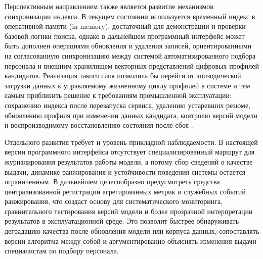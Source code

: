Перспективным направлением также является развитие механизмов синхронизации индекса. В текущем состоянии используется временный индекс в оперативной памяти (in memory), достаточный для демонстрации и проверки базовой логики поиска, однако в дальнейшем программный интерфейс может быть дополнен операциями обновления и удаления записей, ориентированными на согласованную синхронизацию между системой автоматизированного подбора персонала и внешним хранилищем векторных представлений цифровых профилей кандидатов. Реализация такого слоя позволила бы перейти от эпизодической загрузки данных к управляемому жизненному циклу профилей в системе и тем самым приблизить решение к требованиям промышленной эксплуатации: сохранению индекса после перезапуска сервиса, удалению устаревших резюме, обновлению профиля при изменении данных кандидата, контролю версий модели и воспроизводимому восстановлению состояния после сбоя \cite{src12, src32, src33}.

Отдельного развития требует и уровень прикладной наблюдаемости. В настоящей версии программного интерфейса отсутствует специализированный маршрут для журналирования результатов работы модели, а потому сбор сведений о качестве выдачи, динамике ранжирования и устойчивости поведения системы остается ограниченным. В дальнейшем целесообразно предусмотреть средства централизованной регистрации агрегированных метрик и служебных событий ранжирования, что создаст основу для систематического мониторинга, сравнительного тестирования версий модели и более прозрачной интерпретации результатов в эксплуатационной среде. Это позволит быстрее обнаруживать деградацию качества после обновления модели или корпуса данных, сопоставлять версии алгоритма между собой и аргументированно объяснять изменения выдачи специалистам по подбору персонала.

